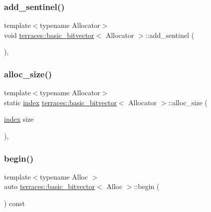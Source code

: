 \subsubsection{\texorpdfstring{add\+\_\+sentinel()}{add\_sentinel()}}
{\footnotesize\ttfamily template$<$typename Allocator$>$ \\
void \hyperlink{classterraces_1_1basic__bitvector}{terraces\+::basic\+\_\+bitvector}$<$ Allocator $>$\+::add\+\_\+sentinel (\begin{DoxyParamCaption}{ }\end{DoxyParamCaption})\hspace{0.3cm}{\ttfamily [inline]}, {\ttfamily [protected]}}

\mbox{\label{classterraces_1_1basic__bitvector_a2256081065bc6537e467f437cfdbef5c}} 
\subsubsection{\texorpdfstring{alloc\+\_\+size()}{alloc\_size()}}
{\footnotesize\ttfamily template$<$typename Allocator$>$ \\
static \hyperlink{namespaceterraces_adbc33ccb543d1634e96d0eb02e472c77}{index} \hyperlink{classterraces_1_1basic__bitvector}{terraces\+::basic\+\_\+bitvector}$<$ Allocator $>$\+::alloc\+\_\+size (\begin{DoxyParamCaption}\item[{\hyperlink{namespaceterraces_adbc33ccb543d1634e96d0eb02e472c77}{index}}]{size }\end{DoxyParamCaption})\hspace{0.3cm}{\ttfamily [inline]}, {\ttfamily [static]}}

\mbox{\label{classterraces_1_1basic__bitvector_a205a9008238b8ed80f126230d80a08f3}} 
\subsubsection{\texorpdfstring{begin()}{begin()}}
{\footnotesize\ttfamily template$<$typename Alloc $>$ \\
auto \hyperlink{classterraces_1_1basic__bitvector}{terraces\+::basic\+\_\+bitvector}$<$ Alloc $>$\+::begin (\begin{DoxyParamCaption}{ }\end{DoxyParamCaption}) const}

